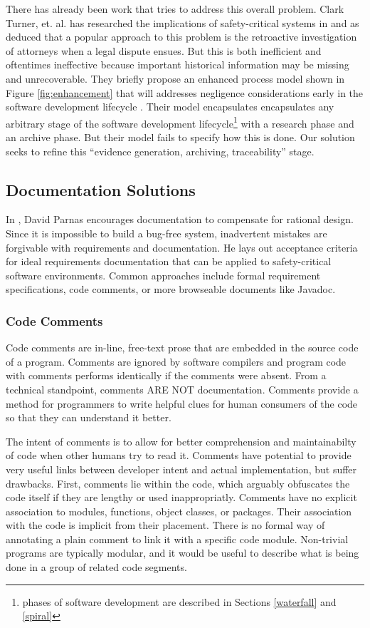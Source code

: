 There has already been work that tries to address this overall problem. Clark
Turner, et. al. has researched the implications of safety-critical systems in
\cite{Turner1996, Turner2000, Turner2001} and as deduced that a popular
approach to this problem is the retroactive investigation of attorneys when a
legal dispute ensues. But this is both inefficient and oftentimes ineffective
because important historical information may be missing and unrecoverable. They
briefly propose an enhanced process model shown in Figure \ref{fig:enhancement}
that will addresses negligence considerations early in the software development
lifecycle \cite{Turner2001}. Their model encapsulates encapsulates any arbitrary
stage of the software development lifecycle\footnote{phases of software
development are described in Sections \ref{waterfall} and \ref{spiral}} with a
research phase and an archive phase. But their model fails to specify how this
is done. Our solution seeks to refine this ``evidence generation, archiving,
traceability'' stage.

\subsection{Documentation Solutions}

In \cite{Parnas1986}, David Parnas encourages documentation to compensate for
rational design. Since it is impossible to build a bug-free system, inadvertent
mistakes are forgivable with requirements and documentation. He lays out
acceptance criteria for ideal requirements documentation that can be applied to
safety-critical software environments. Common approaches include formal
requirement specifications, code comments, or more browseable documents like
Javadoc\cite{Javadoc}.

\subsubsection*{Code Comments}
Code comments are in-line, free-text prose that are embedded in the source code
of a program. Comments are ignored by software compilers and program code with
comments performs identically if the comments were absent. From a technical
standpoint, comments ARE NOT documentation. Comments provide a method for
programmers to write helpful clues for human consumers of the code so that they
can understand it better.

The intent of comments is to allow for better comprehension and maintainabilty
of code when other humans try to read it. Comments have potential to provide
very useful links between developer intent and actual implementation, but suffer
drawbacks. First, comments lie within the code, which arguably obfuscates the
code itself if they are lengthy or used inappropriatly. Comments have no
explicit association to modules, functions, object classes, or packages. Their
association with the code is implicit from their placement. There is no formal
way of annotating a plain comment to link it with a specific code module.
Non-trivial programs are typically modular, and it would be useful to describe
what is being done in a group of related code segments.

